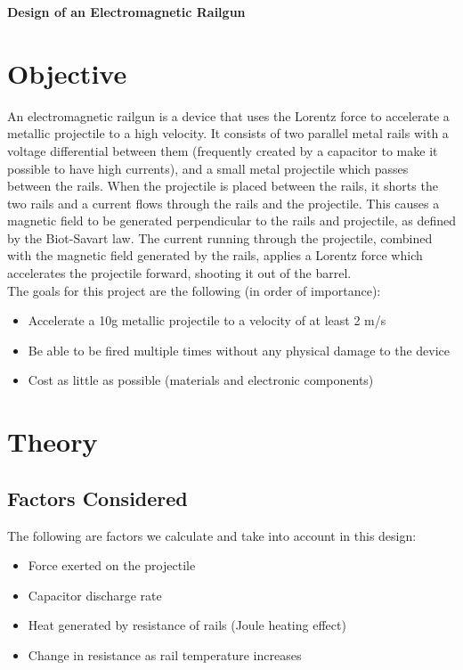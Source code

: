 \documentclass[12pt]{article}
\begin{document}
\begin{center}
    \textbf{\LARGE{Design of an Electromagnetic Railgun}} \\
\end{center}

\section{Objective}
An electromagnetic railgun is a device that uses the Lorentz force to accelerate a metallic projectile to a high velocity. It consists of two parallel metal rails with a voltage differential between them (frequently created by a capacitor to make it possible to have high currents), and a small metal projectile which passes between the rails. When the projectile is placed between the rails, it shorts the two rails and a current flows through the rails and the projectile. This causes a magnetic field to be generated perpendicular to the rails and projectile, as defined by the Biot-Savart law. The current running through the projectile, combined with the magnetic field generated by the rails, applies a Lorentz force which accelerates the projectile forward, shooting it out of the barrel. \\
The goals for this project are the following (in order of importance):
\begin{itemize}
    \item Accelerate a 10g metallic projectile to a velocity of at least 2 m/s
    \item Be able to be fired multiple times without any physical damage to the device 
    \item Cost as little as possible (materials and electronic components)
\end{itemize}

\section{Theory}

\subsection{Factors Considered}
The following are factors we calculate and take into account in this design: 
\begin{itemize}
    \item Force exerted on the projectile
    \item Capacitor discharge rate
    \item Heat generated by resistance of rails (Joule heating effect)
    \item Change in resistance as rail temperature increases
\end{itemize}
\end{document}

